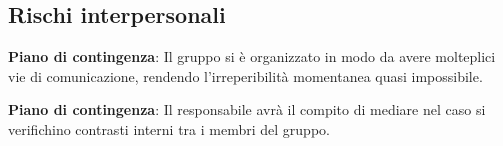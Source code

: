 	\subsection{Rischi interpersonali}
		\def\productquality{
			{
        			Irreperibilità momentanea	RI1,
        			Potrebbero verificarsi momenti in cui uno o più membri del team siano irreperibili, 
        			è responsabilità di ogni membro del gruppo comunicare eventuali imprevisti e organizzarsi in modo da non ostacolare il calendario delle consegne,
        			Occorrenza: Bassa 
				Pericolosità: Media
    			},
		}
		
		\textbf{Piano di contingenza}: Il gruppo si è organizzato in modo da avere molteplici vie di comunicazione, rendendo l'irreperibilità momentanea quasi impossibile.
		\def\productquality{
			{
        			Contrasti interni	RI2,
        			Potrebbero verificarsi divergenze tra i membri del gruppo, 
        			Ciascuno dei membri del team si impegna ad agire al fine di non ostacolare il naturale svolgimento del progetto e discutere di eventuali problemi solo in seduta di riunione,
        			Occorrenza: Bassa 
				Pericolosità: Media
    			},
		}
		
		\textbf{Piano di contingenza}: Il responsabile avrà il compito di mediare nel caso si verifichino contrasti interni tra i membri del gruppo.
